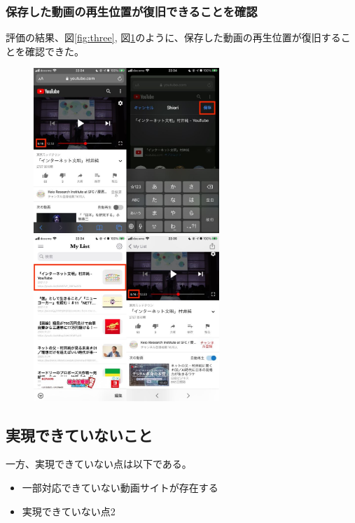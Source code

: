 \documentclass[a4j,10pt]{jsarticle}
\begin{document}
\subsubsection{保存した動画の再生位置が復旧できることを確認}
評価の結果、図\ref{fig:three}, 図\ref{fig:four}のように、保存した動画の再生位置が復旧することを確認できた。
\begin{figure}[htbp]
    \begin{minipage}{0.5\hsize}
        \begin{center}
        \includegraphics[width=70mm]{../assets/playback_position/playback_position1.png}
        \end{center}
        \caption{}
        \label{fig:three}
    \end{minipage}
    \begin{minipage}{0.5\hsize}
        \begin{center}
        \includegraphics[width=70mm]{../assets/playback_position/playback_position2.png}
        \end{center}
        \caption{}
        \label{fig:four}
    \end{minipage}
\end{figure}

\subsection{実現できていないこと}
一方、実現できていない点は以下である。
\begin{itemize}
\item 一部対応できていない動画サイトが存在する
\item 実現できていない点2
\end{itemize}



\end{document}
